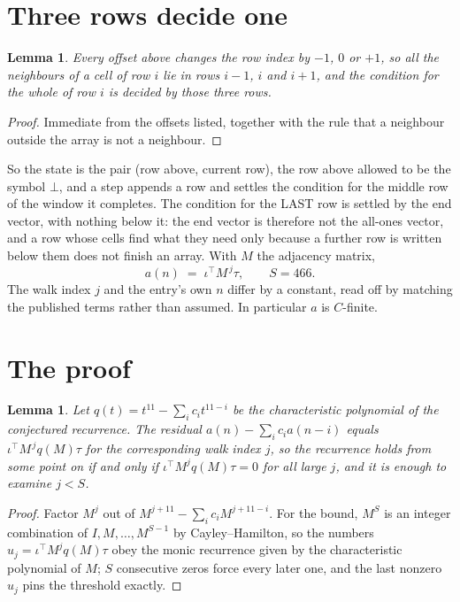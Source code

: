 \documentclass[11pt,a4paper]{article}
\theoremstyle{plain}
\newtheorem{lemma}[theorem]{Lemma}
\theoremstyle{definition}
\begin{document}
\section{Three rows decide one}

\begin{lemma}\label{lem:win}
Every offset above changes the row index by $-1$, $0$ or $+1$, so all the neighbours of a cell
of row $i$ lie in rows $i-1$, $i$ and $i+1$, and the condition for the whole of row $i$ is
decided by those three rows.
\end{lemma}

\begin{proof}
Immediate from the offsets listed, together with the rule that a neighbour outside the array is
not a neighbour.
\end{proof}

So the state is the pair (row above, current row), the row above allowed to be the symbol
$\bot$, and a step appends a row and settles the condition for the middle row of the window it
completes. The condition for the LAST row is settled by the end vector, with nothing below it:
the end vector is therefore not the all-ones vector, and a row whose cells find what they need
only because a further row is written below them does not finish an array. With $M$ the
adjacency matrix,
\[
a(n)\;=\;\iota^{\!\top}M^{\,j}\tau ,\qquad S=466.
\]
The walk index $j$ and the entry's own $n$ differ by a constant, read off by matching the
published terms rather than assumed. In particular $a$ is $C$-finite.

\section{The proof}

\begin{lemma}\label{lem:crit}
Let $q(t)=t^{11}-\sum_i c_it^{11-i}$ be the characteristic polynomial of the
conjectured recurrence. The residual $a(n)-\sum_ic_ia(n-i)$ equals
$\iota^{\!\top}M^{\,j}q(M)\tau$ for the corresponding walk index $j$, so the recurrence
holds from some point on if and only if $\iota^{\!\top}M^{j}q(M)\tau=0$ for all large $j$,
and it is enough to examine $j<S$.
\end{lemma}

\begin{proof}
Factor $M^{j}$ out of $M^{j+11}-\sum_ic_iM^{j+11-i}$. For the bound, $M^{S}$
is an integer combination of $I,M,\dots,M^{S-1}$ by Cayley--Hamilton, so the numbers
$u_j=\iota^{\!\top}M^{j}q(M)\tau$ obey the monic recurrence given by the characteristic
polynomial of $M$; $S$ consecutive zeros force every later one, and the last nonzero $u_j$
pins the threshold exactly.
\end{proof}
\end{document}
